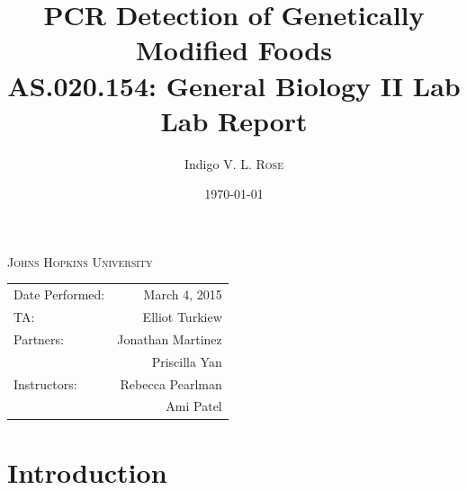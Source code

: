 \documentclass{article}
\title{PCR Detection of Genetically Modified Foods\\ AS.020.154: General Biology II Lab \\ Lab Report} %
\author{Indigo V. L. \textsc{Rose}} %
\date{\today} %
\begin{document}
\maketitle %
\begin{center}
\textsc{Johns Hopkins University} \\ %
\end{center}

\begin{center}
\begin{tabular}{l r}
Date Performed: & March 4, 2015 \\ %
TA: & Elliot Turkiew \\ %
Partners: & Jonathan Martinez \\ %
& Priscilla Yan \\
Instructors: &  Rebecca Pearlman \\ %
& Ami Patel
\end{tabular}
\end{center}



\section{Introduction}
\end{document}
